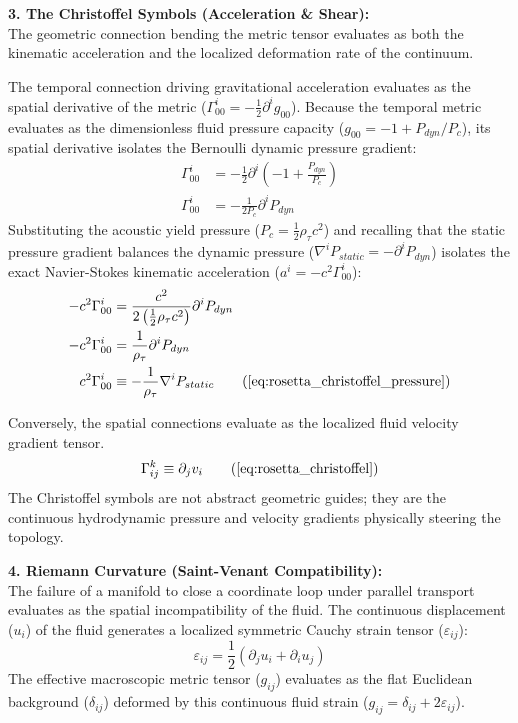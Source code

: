 \documentclass[11pt, a4paper]{article}
\begin{document}
\textbf{3. The Christoffel Symbols (Acceleration \& Shear):} \\
The geometric connection bending the metric tensor evaluates as both the kinematic acceleration and the localized deformation rate of the continuum. 

The temporal connection driving gravitational acceleration evaluates as the spatial derivative of the metric ($\Gamma^i_{00} = -\frac{1}{2}\partial^i g_{00}$). Because the temporal metric evaluates as the dimensionless fluid pressure capacity ($g_{00} = -1 + P_{dyn}/P_c$), its spatial derivative isolates the Bernoulli dynamic pressure gradient:
\begin{align}
    \Gamma^i_{00} &= -\frac{1}{2}\partial^i \left( -1 + \frac{P_{dyn}}{P_c} \right) \nonumber \\
    \Gamma^i_{00} &= -\frac{1}{2 P_c} \partial^i P_{dyn} \nonumber
\end{align}
Substituting the acoustic yield pressure ($P_c = \frac{1}{2}\rho_{\tau} c^2$) and recalling that the static pressure gradient   balances the dynamic pressure ($\nabla^i P_{static} = -\partial^i P_{dyn}$) isolates the exact Navier-Stokes kinematic acceleration ($a^i = -c^2 \Gamma^i_{00}$):
\begin{align}
    -c^2 \Gamma^i_{00} &= \frac{c^2}{2 \left(\frac{1}{2}\rho_{\tau} c^2\right)} \partial^i P_{dyn} \nonumber \\
    -c^2 \Gamma^i_{00} &= \frac{1}{\rho_{\tau}} \partial^i P_{dyn} \nonumber \\
    c^2 \Gamma^i_{00} &\equiv -\frac{1}{\rho_{\tau}} \nabla^i P_{static} \tag{\ref{eq:rosetta_christoffel_pressure}}
\end{align}

Conversely, the spatial connections evaluate as the localized fluid velocity gradient tensor.
\begin{equation}
    \Gamma^k_{ij} \equiv \partial_j v_i \tag{\ref{eq:rosetta_christoffel}}
\end{equation}
The Christoffel symbols are not abstract geometric guides; they are the continuous hydrodynamic pressure and velocity gradients physically steering the topology.

\textbf{4. Riemann Curvature (Saint-Venant Compatibility):} \\
The failure of a manifold to close a coordinate loop under parallel transport evaluates as the spatial incompatibility of the fluid. The continuous displacement ($u_i$) of the fluid generates a localized symmetric Cauchy strain tensor ($\varepsilon_{ij}$):
\begin{equation}
    \varepsilon_{ij} = \frac{1}{2}(\partial_j u_i + \partial_i u_j) 
\end{equation}
The effective macroscopic metric tensor ($g_{ij}$) evaluates as the flat Euclidean background ($\delta_{ij}$) deformed by this continuous fluid strain ($g_{ij} = \delta_{ij} + 2\varepsilon_{ij}$). 
\end{document}

